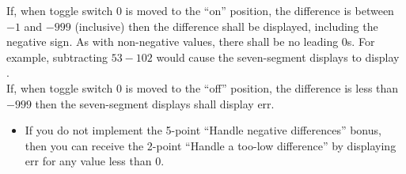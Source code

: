 \begin{description}
        If, when toggle switch 0 is moved to the ``on'' position, the
        difference is between $-1$ and $- 999$ (inclusive) then the difference
        shall be displayed, including the negative sign. As with non-negative
        values, there shall be no leading $0$s. For example, subtracting
        $53-102$ would cause the seven-segment displays to display
        {}.
 \\
        If, when toggle switch 0 is moved to the ``off'' position, the
        difference is less than $-999$ then the seven-segment displays shall
        display {\dviiseg err}.
    \begin{itemize}
        \item If you do not implement the 5-point ``Handle negative
        differences'' bonus, then you can receive the 2-point ``Handle a
        too-low difference'' by displaying {\dviiseg err} for any value less
        than $0$.
    \end{itemize}
\end{description}


